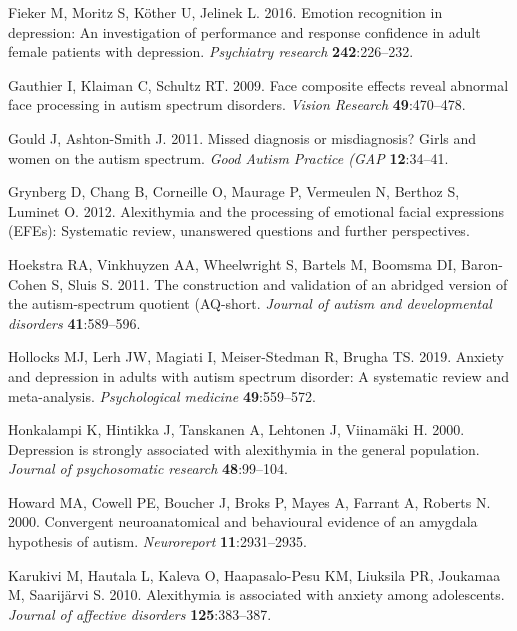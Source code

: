 \documentclass[
]{article}
\newlength{\cslhangindent}
\newlength{\cslentryspacingunit} %
\newenvironment{CSLReferences}[2] %
 {%
  \setlength{\parindent}{0pt}
  \ifodd #1
  \let\oldpar\par
  \def\par{\hangindent=\cslhangindent\oldpar}
  \fi
  \setlength{\parskip}{#2\cslentryspacingunit}
 }%
 {}
\begin{document}
\begin{CSLReferences}{1}{0}
\leavevmode{}%
Fieker M, Moritz S, Köther U, Jelinek L. 2016. Emotion recognition in depression: An investigation of performance and response confidence in adult female patients with depression. \emph{Psychiatry research} \textbf{242}:226--232.

\leavevmode{}%
Gauthier I, Klaiman C, Schultz RT. 2009. Face composite effects reveal abnormal face processing in autism spectrum disorders. \emph{Vision Research} \textbf{49}:470--478.

\leavevmode{}%
Gould J, Ashton-Smith J. 2011. Missed diagnosis or misdiagnosis? Girls and women on the autism spectrum. \emph{Good Autism Practice (GAP} \textbf{12}:34--41.

\leavevmode{}%
Grynberg D, Chang B, Corneille O, Maurage P, Vermeulen N, Berthoz S, Luminet O. 2012. Alexithymia and the processing of emotional facial expressions (EFEs): Systematic review, unanswered questions and further perspectives.

\leavevmode{}%
Hoekstra RA, Vinkhuyzen AA, Wheelwright S, Bartels M, Boomsma DI, Baron-Cohen S, Sluis S. 2011. The construction and validation of an abridged version of the autism-spectrum quotient (AQ-short. \emph{Journal of autism and developmental disorders} \textbf{41}:589--596.

\leavevmode{}%
Hollocks MJ, Lerh JW, Magiati I, Meiser-Stedman R, Brugha TS. 2019. Anxiety and depression in adults with autism spectrum disorder: A systematic review and meta-analysis. \emph{Psychological medicine} \textbf{49}:559--572.

\leavevmode{}%
Honkalampi K, Hintikka J, Tanskanen A, Lehtonen J, Viinamäki H. 2000. Depression is strongly associated with alexithymia in the general population. \emph{Journal of psychosomatic research} \textbf{48}:99--104.

\leavevmode{}%
Howard MA, Cowell PE, Boucher J, Broks P, Mayes A, Farrant A, Roberts N. 2000. Convergent neuroanatomical and behavioural evidence of an amygdala hypothesis of autism. \emph{Neuroreport} \textbf{11}:2931--2935.

\leavevmode{}%
Karukivi M, Hautala L, Kaleva O, Haapasalo-Pesu KM, Liuksila PR, Joukamaa M, Saarijärvi S. 2010. Alexithymia is associated with anxiety among adolescents. \emph{Journal of affective disorders} \textbf{125}:383--387.


\end{CSLReferences}
\end{document}
